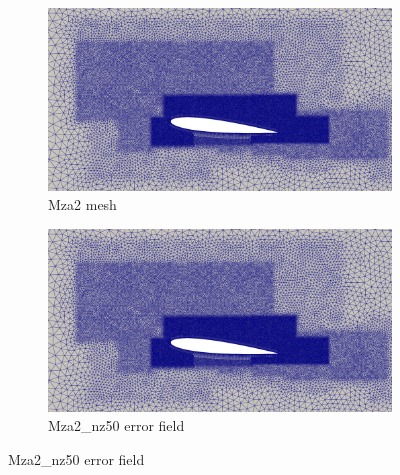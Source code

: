 \begin{figure}[H]
\begin{subfigure}[b]{0.475\textwidth}
	\centering
	\includegraphics[width=1\textwidth]{figures/zonal_adapt_results/Mesh_and_error_plots/Mza2_inplane.png}
	\caption{Mza2 mesh}
	\label{fig:zonal_Mza2_mesh}
\end{subfigure}
\begin{subfigure}[b]{0.475\textwidth}
	\centering
	\includegraphics[width=1\textwidth]{figures/zonal_adapt_results/Mesh_and_error_plots/Mza2_inplane.png}
	\caption{Mza2\_nz50 error field}
	\label{fig:zonal_Mza2_error}
\end{subfigure}


\end{figure}
